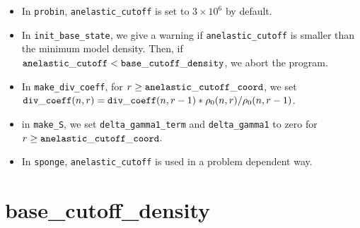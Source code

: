 \begin{itemize}

\item In {\tt probin}, {\tt anelastic\_cutoff} is set to $3\times 10^6$ by default.

\item In {\tt init\_base\_state}, we give a warning if {\tt anelastic\_cutoff}
  is smaller than the minimum model density.  Then, if ${\tt anelastic\_cutoff} 
  < {\tt base\_cutoff\_density}$, we abort the program.

\item In {\tt make\_div\_coeff}, for 
  $r \ge {\tt anelastic\_cutoff\_coord}$, we set
  ${\tt div\_coeff}(n,r) = {\tt div\_coeff}(n,r-1) * \rho_0(n,r)/\rho_0(n,r-1)$.

\item in {\tt make\_S}, we set {\tt delta\_gamma1\_term} and {\tt delta\_gamma1} 
  to zero for $r \ge {\tt anelastic\_cutoff\_coord}$.

\item In {\tt sponge}, {\tt anelastic\_cutoff} is used in a problem
  dependent way.

\end{itemize}

\section{base\_cutoff\_density}\label{Sec:Base Cutoff Density}

